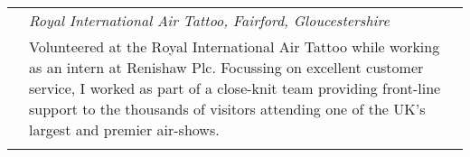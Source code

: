 \documentclass[a4paper, 10pt]{extarticle} %
\begin{document}
\begin{tabular}{r | p{13cm}}
		 &
		 
		\textit{Royal International Air Tattoo, Fairford, Gloucestershire} \\ 
		
& 

\footnotesize{

Volunteered at the Royal International Air Tattoo while working as an intern at Renishaw Plc. Focussing on excellent customer service, I worked as part of a close-knit team providing front-line support to the thousands of visitors attending one of the UK's largest and premier air-shows. 

\vspace{-0.4cm}

} \vspace{-0.4cm} \\

\multicolumn{2}{c}{}

\end{tabular}


%
%

%
%
%
%
\end{document}

